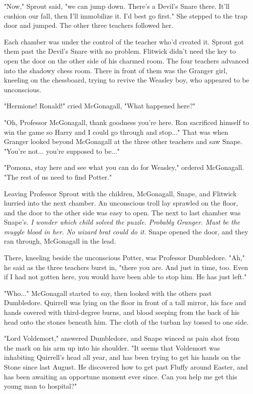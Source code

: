"Now," Sprout said, "we can jump down. There's a Devil's Snare there. It'll cushion our fall, then I'll immobilize it. I'd best go first." She stepped to the trap door and jumped. The other three teachers followed her.

Each chamber was under the control of the teacher who'd created it. Sprout got them past the Devil's Snare with no problem. Flitwick didn't need the key to open the door on the other side of his charmed room. The four teachers advanced into the shadowy chess room. There in front of them was the Granger girl, kneeling on the chessboard, trying to revive the Weasley boy, who appeared to be unconscious.

"Hermione! Ronald!" cried McGonagall, "What happened here?"

"Oh, Professor McGonagall, thank goodness you're here. Ron sacrificed himself to win the game so Harry and I could go through and stop..." That was when Granger looked beyond McGonagall at the three other teachers and saw Snape. "You're not... you're supposed to be..."

"Pomona, stay here and see what you can do for Weasley," ordered McGonagall. "The rest of us need to find Potter."

Leaving Professor Sprout with the children, McGonagall, Snape, and Flitwick hurried into the next chamber. An unconscious troll lay sprawled on the floor, and the door to the other side was easy to open. The next to last chamber was Snape's. \emph{I wonder which child solved the puzzle. Probably Granger. Must be the muggle blood in her. No wizard brat could do it.} Snape opened the door, and they ran through, McGonagall in the lead.

There, kneeling beside the unconscious Potter, was Professor Dumbledore. "Ah," he said as the three teachers burst in, "there you are. And just in time, too. Even if I had not gotten here, you would have been able to stop him. He has just left."

"Who..." McGonagall started to say, then looked with the others past Dumbledore. Quirrell was lying on the floor in front of a tall mirror, his face and hands covered with third-degree burns, and blood seeping from the back of his head onto the stones beneath him. The cloth of the turban lay tossed to one side.

"Lord Voldemort," answered Dumbledore, and Snape winced as pain shot from the mark on his arm up into his shoulder. "It seems that Voldemort was inhabiting Quirrell's head all year, and has been trying to get his hands on the Stone since last August. He discovered how to get past Fluffy around Easter, and has been awaiting an opportune moment ever since. Can you help me get this young man to hospital?"

